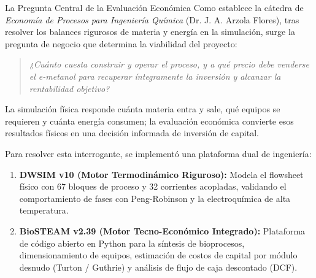 \documentclass[11pt,letterpaper]{article}
\begin{document}
\begin{conceptbox}{La Pregunta Central de la Evaluación Económica}
Como establece la cátedra de \textit{Economía de Procesos para Ingeniería Química} (Dr. J. A. Arzola Flores), tras resolver los balances rigurosos de materia y energía en la simulación, surge la pregunta de negocio que determina la viabilidad del proyecto:
\begin{quote}
\textit{¿Cuánto cuesta construir y operar el proceso, y a qué precio debe venderse el e-metanol para recuperar íntegramente la inversión y alcanzar la rentabilidad objetivo?}
\end{quote}
La simulación física responde cuánta materia entra y sale, qué equipos se requieren y cuánta energía consumen; la evaluación económica convierte esos resultados físicos en una decisión informada de inversión de capital.
\end{conceptbox}

Para resolver esta interrogante, se implementó una plataforma dual de ingeniería:
\begin{enumerate}
    \item \textbf{DWSIM v10 (Motor Termodinámico Riguroso):} Modela el flowsheet físico con 67 bloques de proceso y 32 corrientes acopladas, validando el comportamiento de fases con Peng-Robinson y la electroquímica de alta temperatura.
    \item \textbf{BioSTEAM v2.39 (Motor Tecno-Económico Integrado):} Plataforma de código abierto en Python para la síntesis de bioprocesos, dimensionamiento de equipos, estimación de costos de capital por módulo desnudo (Turton / Guthrie) y análisis de flujo de caja descontado (DCF).
\end{enumerate}
\end{document}
